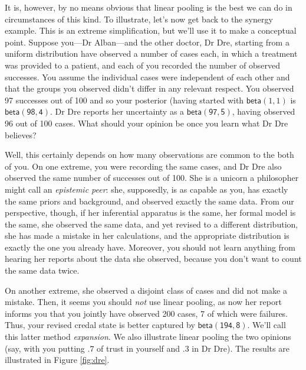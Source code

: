 \documentclass[
  10pt,
  dvipsnames,enabledeprecatedfontcommands]{scrartcl}
\begin{document}
It is, however, by no means obvious that linear pooling is the best we
can do in circumstances of this kind. To illustrate, let's now get back
to the synergy example. This is an extreme simplification, but we'll use
it to make a conceptual point. Suppose you---Dr Alban---and the other
doctor, Dr Dre, starting from a uniform distribution have observed a
number of cases each, in which a treatment was provided to a patient,
and each of you recorded the number of observed successes. You assume
the individual cases were independent of each other and that the groups
you observed didn't differ in any relevant respect. You observed 97
successes out of 100 and so your posterior (having started with
\(\mathsf{beta}(1,1)\) is \(\mathsf{beta(98,4)}\). Dr Dre reports her
uncertainty as a \(\mathsf{beta(97,5)}\), having observed 96 out of 100
cases. What should your opinion be once you learn what Dr Dre believes?

Well, this certainly depends on how many observations are common to the
both of you. On one extreme, you were recording the same cases, and Dr
Dre also observed the same number of successes out of 100. She is a
unicorn a philosopher might call an \emph{epistemic peer}: she,
supposedly, is as capable as you, has exactly the same priors and
background, and observed exactly the same data. From our perspective,
though, if her inferential apparatus is the same, her formal model is
the same, she observed the same data, and yet revised to a different
distribution, she has made a mistake in her calculations, and the
appropriate distribution is exactly the one you already have. Moreover,
you should not learn anything from hearing her reports about the data
she observed, because you don't want to count the same data twice.

On another extreme, she observed a disjoint class of cases and did not
make a mistake. Then, it seems you should \emph{not} use linear pooling,
as now her report informs you that you jointly have observed 200 cases,
7 of which were failures. Thus, your revised credal state is better
captured by \(\mathsf{beta(194,8)}\). We'll call this latter method
\emph{expansion}. We also illustrate linear pooling the two opinions
(say, with you putting \(.7\) of trust in yourself and \(.3\) in Dr
Dre). The results are illustrated in Figure \ref{fig:dre}.
\end{document}
